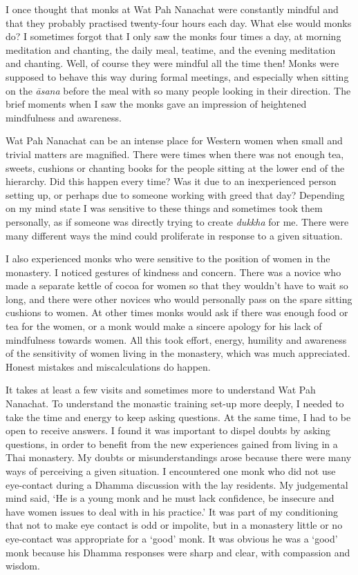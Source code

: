 I once thought that monks at Wat Pah Nanachat were constantly mindful
and that they probably practised twenty-four hours each day. What else
would monks do? I sometimes forgot that I only saw the monks four times
a day, at morning meditation and chanting, the daily meal, teatime, and
the evening meditation and chanting. Well, of course they were mindful
all the time then! Monks were supposed to behave this way during formal
meetings, and especially when sitting on the \emph{āsana} before the
meal with so many people looking in their direction. The brief moments
when I saw the monks gave an impression of heightened mindfulness and
awareness.

Wat Pah Nanachat can be an intense place for Western women when small
and trivial matters are magnified. There were times when there was not
enough tea, sweets, cushions or chanting books for the people sitting at
the lower end of the hierarchy. Did this happen every time? Was it due
to an inexperienced person setting up, or perhaps due to someone working
with greed that day? Depending on my mind state I was sensitive to these
things and sometimes took them personally, as if someone was directly
trying to create \emph{dukkha} for me. There were many different ways
the mind could proliferate in response to a given situation.

I also experienced monks who were sensitive to the position of women in
the monastery. I noticed gestures of kindness and concern. There was a
novice who made a separate kettle of cocoa for women so that they
wouldn't have to wait so long, and there were other novices who would
personally pass on the spare sitting cushions to women. At other times
monks would ask if there was enough food or tea for the women, or a monk
would make a sincere apology for his lack of mindfulness towards women.
All this took effort, energy, humility and awareness of the sensitivity
of women living in the monastery, which was much appreciated. Honest
mistakes and miscalculations do happen.

It takes at least a few visits and sometimes more to understand Wat Pah
Nanachat. To understand the monastic training set-up more deeply, I
needed to take the time and energy to keep asking questions. At the same
time, I had to be open to receive answers. I found it was important to
dispel doubts by asking questions, in order to benefit from the new
experiences gained from living in a Thai monastery. My doubts or
misunderstandings arose because there were many ways of perceiving a
given situation. I encountered one monk who did not use eye-contact
during a Dhamma discussion with the lay residents. My judgemental mind
said, `He is a young monk and he must lack confidence, be insecure and
have women issues to deal with in his practice.' It was part of my
conditioning that not to make eye contact is odd or impolite, but in a
monastery little or no eye-contact was appropriate for a `good' monk. It
was obvious he was a `good' monk because his Dhamma responses were sharp
and clear, with compassion and wisdom.

